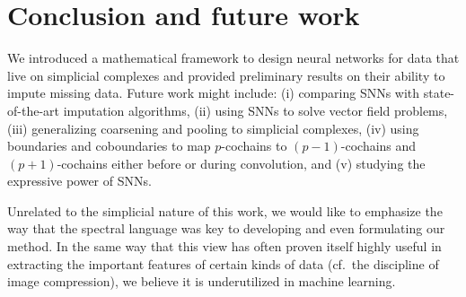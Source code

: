 \section{Conclusion and future work}

We introduced a mathematical framework to design neural networks for data that live on simplicial complexes and provided preliminary results on their ability to impute missing data.
Future work might include: (i) comparing SNNs with state-of-the-art imputation algorithms, (ii) using SNNs to solve vector field problems, (iii) generalizing coarsening and pooling to simplicial complexes, (iv) using boundaries and coboundaries to map $p$-cochains to $(p-1)$-cochains and $(p+1)$-cochains either before or during convolution, and (v) studying the expressive power of SNNs.

Unrelated to the simplicial nature of this work, we would like to emphasize the way that the spectral language was key to developing and even formulating our method. In the same way that this view has often proven itself highly useful in extracting the important features of certain kinds of data (cf.\ the discipline of image compression), we believe it is underutilized in machine learning.
